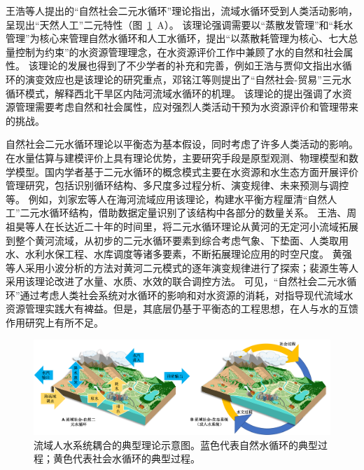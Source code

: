 王浩等人提出的“自然\textendash{}社会二元水循环”理论指出，流域水循环受到人类活动影响，呈现出“天然\textendash{}人工”二元特性\cite{wang2006}（图~\ref{ch1:fig:two_water_cycle}~A）。
该理论强调需要以“蒸散发管理”和“耗水管理”为核心来管理自然水循环和人工水循环，提出“以蒸散耗管理为核心、七大总量控制为约束”的水资源管理理念，在水资源评价工作中兼顾了水的自然和社会属性\cite{wang2010}。
该理论的发展也得到了不少学者的补充和完善，例如王浩与贾仰文指出水循环的演变效应也是该理论的研究重点\cite{wang2016}，邓铭江等则提出了“自然\textendash{}社会-贸易”三元水循环模式，解释西北干旱区内陆河流域水循环的机理\cite{deng2020}。
该理论的提出强调了水资源管理需要考虑自然和社会属性，应对强烈人类活动干预为水资源评价和管理带来的挑战。

自然\textendash{}社会二元水循环理论以平衡态为基本假设，同时考虑了许多人类活动的影响。在水量估算与建模评价上具有理论优势，主要研究手段是原型观测、物理模型和数学模型。国内学者基于二元水循环的概念模式主要在水资源和水生态方面开展评价管理研究，包括识别循环结构、多尺度多过程分析、演变规律、未来预测与调控等\cite{wang2016}。
例如，刘家宏等人在海河流域应用该理论，构建水平衡方程厘清“自然\textendash{}人工”二元水循环结构，借助数据定量识别了该结构中各部分的数量关系\cite{liu2010}。
王浩\cite{wang2004}、周祖昊\cite{zhou2022}等人在长达近二十年的时间里，将二元水循环理论从黄河的无定河小流域拓展到整个黄河流域，从初步的二元水循环要素到综合考虑气象、下垫面、人类取用水、水利水保工程、水库调度等诸多要素，不断拓展理论应用的时空尺度。
黄强等人采用小波分析的方法对黄河二元模式的逐年演变规律进行了探索\cite{huang2002}；裴源生等人采用该理论改进了水量、水质、水效的联合调控方法\cite{pei2020}。
可见，“自然\textendash{}社会二元水循环”通过考虑人类社会系统对水循环的影响和对水资源的消耗，对指导现代流域水资源管理实践大有裨益。但是，其底层仍基于平衡态的工程思想，在人与水的互馈作用研究上有所不足。

\begin{figure}[!ht]
    \centering
    \includegraphics[width=\textwidth]{img/ch1/ch1_two_water_cycle.png}
    \caption[流域人水耦合系统的典型理论示意图]{流域人\textendash{}水系统耦合的典型理论示意图\cite{wang2006,dibaldassarre2015}。蓝色代表自然水循环的典型过程；黄色代表社会水循环的典型过程。}\label{ch1:fig:two_water_cycle}
\end{figure}

